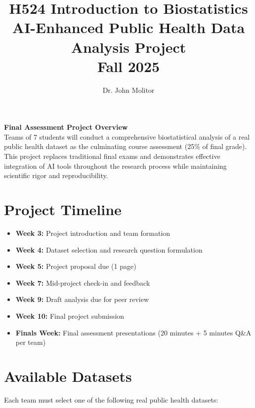 \documentclass[11pt]{article}
\title{\textbf{H524 Introduction to Biostatistics\\
\Large AI-Enhanced Public Health Data Analysis Project\\
Fall 2025}}
\author{Dr. John Molitor}
\date{}
\begin{document}
\maketitle

\begin{tcolorbox}[colback=aiblue!10,colframe=aiblue,boxrule=2pt,arc=2pt,left=6pt,right=6pt,top=6pt,bottom=6pt]
\centering
\textbf{\large Final Assessment Project Overview}\\[0.3em]
Teams of 7 students will conduct a comprehensive biostatistical analysis of a real public health dataset as the culminating course assessment (25\% of final grade). This project replaces traditional final exams and demonstrates effective integration of AI tools throughout the research process while maintaining scientific rigor and reproducibility.
\end{tcolorbox}

\section{Project Timeline}
\begin{itemize}[leftmargin=20pt]
\item \textbf{Week 3:} Project introduction and team formation
\item \textbf{Week 4:} Dataset selection and research question formulation
\item \textbf{Week 5:} Project proposal due (1 page)
\item \textbf{Week 7:} Mid-project check-in and feedback
\item \textbf{Week 9:} Draft analysis due for peer review
\item \textbf{Week 10:} Final project submission
\item \textbf{Finals Week:} Final assessment presentations (20 minutes + 5 minutes Q\&A per team)
\end{itemize}

\section{Available Datasets}

Each team must select one of the following real public health datasets:
\end{document}
